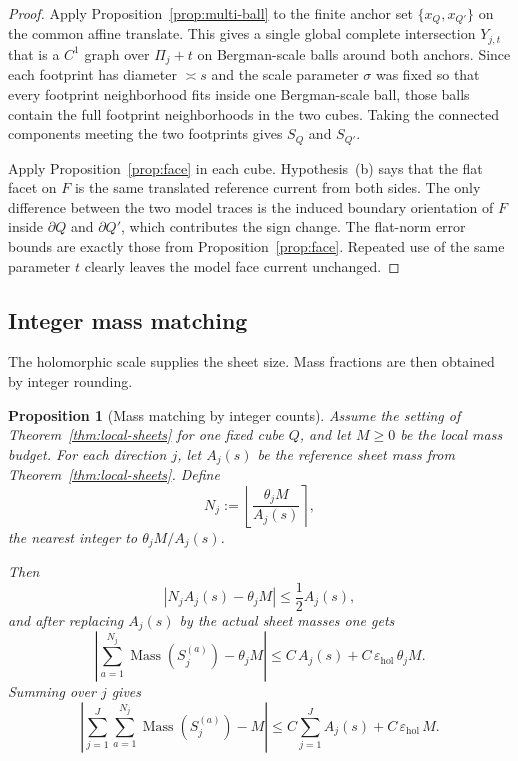 \documentclass[11pt]{article}
\numberwithin{equation}{section}
\theoremstyle{plain}
\newtheorem{proposition}[theorem]{Proposition}
\theoremstyle{definition}
\theoremstyle{remark}
\DeclareMathOperator{\Mass}{Mass}
\newcommand{\eps}{\varepsilon}
\begin{document}
\begin{proof}
Apply Proposition~\ref{prop:multi-ball} to the finite anchor set
$\{x_Q,x_{Q'}\}$ on the common affine translate.  This gives a single global
complete intersection $Y_{j,t}$ that is a $C^1$ graph over $\Pi_j+t$ on
Bergman-scale balls around both anchors.  Since each footprint has diameter
$\asymp s$ and the scale parameter $\sigma$ was fixed so that every footprint
neighborhood fits inside one Bergman-scale ball, those balls contain the full
footprint neighborhoods in the two cubes.  Taking the connected components
meeting the two footprints gives $S_Q$ and $S_{Q'}$.

Apply Proposition~\ref{prop:face} in each cube.  Hypothesis~\textnormal{(b)}
says that the flat facet on $F$ is the same translated reference current from
both sides.  The only difference between the two model traces is the induced
boundary orientation of $F$ inside $\partial Q$ and $\partial Q'$, which
contributes the sign change.  The flat-norm error bounds are exactly those from
Proposition~\ref{prop:face}.  Repeated use of the same parameter $t$ clearly
leaves the model face current unchanged.
\end{proof}

\subsection{Integer mass matching}

The holomorphic scale supplies the sheet size.  Mass fractions are then obtained by integer rounding.

\begin{proposition}[Mass matching by integer counts]\label{prop:round}
Assume the setting of Theorem~\ref{thm:local-sheets} for one fixed cube $Q$, and let $M\ge 0$ be the local mass budget.  For each direction $j$, let $A_j(s)$ be the reference sheet mass from Theorem~\ref{thm:local-sheets}.  Define
\[
N_j := \left\lfloor \frac{\theta_j M}{A_j(s)} \right\rceil,
\]
the nearest integer to $\theta_j M/A_j(s)$.

Then
\[
\left|
N_j A_j(s)-\theta_j M
\right|
\le \frac12 A_j(s),
\]
and after replacing $A_j(s)$ by the actual sheet masses one gets
\[
\left|
\sum_{a=1}^{N_j}\Mass(S_j^{(a)})-\theta_j M
\right|
\le
C\,A_j(s)+C\,\eps_{\mathrm{hol}}\,\theta_j M.
\]
Summing over $j$ gives
\[
\left|
\sum_{j=1}^J\sum_{a=1}^{N_j}\Mass(S_j^{(a)}) - M
\right|
\le
C\sum_{j=1}^J A_j(s)
+
C\,\eps_{\mathrm{hol}}\,M.
\]
\end{proposition}
\end{document}
